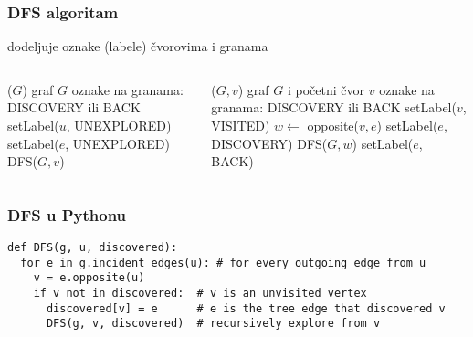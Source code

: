\documentclass[compress,aspectratio=169]{beamer}
\begin{document}
\begin{frame}[fragile]
  \frametitle{DFS algoritam}
  dodeljuje oznake (labele) čvorovima i granama
  {\footnotesize
  \begin{columns}
    \begin{column}[t]{8cm}
      \begin{algorithmic}
        \STATE {}($G$)
        \REQUIRE graf $G$
        \ENSURE oznake na granama: {\scriptsize DISCOVERY} ili {\scriptsize BACK}
          \STATE setLabel($u$, {\scriptsize UNEXPLORED})
        \ENDFOR
          \STATE setLabel($e$, {\scriptsize UNEXPLORED})
        \ENDFOR
            \STATE DFS($G,v$)
          \ENDIF
        \ENDFOR
      \end{algorithmic}
    \end{column}
    \begin{column}[t]{8cm}
      \begin{algorithmic}
        \STATE {}($G,v$)
        \REQUIRE graf $G$ i početni čvor $v$
        \ENSURE oznake na granama: {\scriptsize DISCOVERY} ili {\scriptsize BACK}
        \STATE setLabel($v$, {\scriptsize VISITED})
            \STATE $w \leftarrow$ opposite($v,e$)
              \STATE setLabel($e$, {\scriptsize DISCOVERY})
              \STATE DFS($G, w$)
            \ELSE
              \STATE setLabel($e$, {\scriptsize BACK})
            \ENDIF
          \ENDIF
        \ENDFOR
      \end{algorithmic}
    \end{column}
  \end{columns}
  }
\end{frame}

\begin{frame}[fragile,shrink=15]
  \frametitle{DFS u Pythonu}
\begin{verbatim}
def DFS(g, u, discovered):
  for e in g.incident_edges(u): # for every outgoing edge from u
    v = e.opposite(u)
    if v not in discovered:  # v is an unvisited vertex
      discovered[v] = e      # e is the tree edge that discovered v
      DFS(g, v, discovered)  # recursively explore from v
\end{verbatim}
\end{frame}
\end{document}
